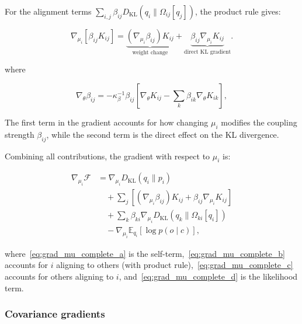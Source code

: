 \documentclass[twoside,11pt]{article}
\begin{document}
For the alignment terms $\sum_{i,j} \beta_{ij} D_{\mathrm{KL}}(q_i \| \Omega_{ij}[q_j])$, the product rule gives:

\begin{equation}
\nabla_{\mu_i} \left[\beta_{ij} K_{ij}\right] = 
\underbrace{(\nabla_{\mu_i} \beta_{ij}) K_{ij}}_{\text{weight change}}
+ \underbrace{\beta_{ij} \nabla_{\mu_i} K_{ij}}_{\text{direct KL gradient}}.
\label{eq:product_rule_alignment}
\end{equation}

where

\begin{equation}
\nabla_\theta \beta_{ij} = -\kappa_\beta^{-1} \beta_{ij} \left[\nabla_\theta K_{ij} - \sum_k \beta_{ik} \nabla_\theta K_{ik}\right],
\label{eq:grad_beta}
\end{equation}

The first term in the gradient accounts for how changing $\mu_i$ modifies the coupling strength $\beta_{ij}$, while the second term is the direct effect on the KL divergence.


Combining all contributions, the gradient with respect to $\mu_i$ is:

\begin{align}
\nabla_{\mu_i} \mathcal{F} &= 
\nabla_{\mu_i} D_{\mathrm{KL}}(q_i \| p_i) \label{eq:grad_mu_complete_a} \\
&\quad + \sum_j \left[(\nabla_{\mu_i} \beta_{ij}) K_{ij} + \beta_{ij} \nabla_{\mu_i} K_{ij}\right] \label{eq:grad_mu_complete_b} \\
&\quad + \sum_k \beta_{ki} \nabla_{\mu_i} D_{\mathrm{KL}}(q_k \| \Omega_{ki}[q_i]) \label{eq:grad_mu_complete_c} \\
&\quad - \nabla_{\mu_i} \mathbb{E}_{q_i}[\log p(o \mid c)], \label{eq:grad_mu_complete_d}
\end{align}

where~\eqref{eq:grad_mu_complete_a} is the self-term,~\eqref{eq:grad_mu_complete_b} accounts for $i$ aligning to others (with product rule),~\eqref{eq:grad_mu_complete_c} accounts for others aligning to $i$, and~\eqref{eq:grad_mu_complete_d} is the likelihood term.

\subsubsection{Covariance gradients}
\end{document}
